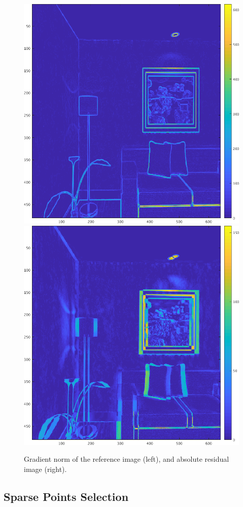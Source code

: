 \begin{figure}[ht]
	\centering
	\includegraphics[width=0.48\linewidth]{assets/img/im_grad.png}
	\hfill
	\includegraphics[width=0.48\linewidth]{assets/img/im_diff.png}
	\caption{Gradient norm of the reference image (left), and absolute residual image (right).}%
	\label{fig:gradient-residual}
\end{figure}

\subsection{Sparse Points Selection}%
\label{sub:sparse-points}

